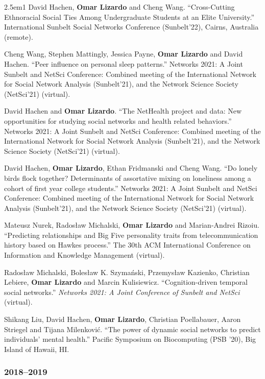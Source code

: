 \documentclass[
]{article}
\newenvironment{cventry}{\begin{hangparas}{2.5em}{1}}{\end{hangparas}}
\begin{document}
\begin{cventry}
David Hachen, \textbf{Omar Lizardo} and Cheng Wang. ``Cross-Cutting
Ethnoracial Social Ties Among Undergraduate Students at an Elite
University.'' International Sunbelt Social Networks Conference
(Sunbelt'22), Cairns, Australia (remote).

Cheng Wang, Stephen Mattingly, Jessica Payne, \textbf{Omar Lizardo} and
David Hachen. ``Peer influence on personal sleep patterns.'' Networks
2021: A Joint Sunbelt and NetSci Conference: Combined meeting of the
International Network for Social Network Analysis (Sunbelt'21), and the
Network Science Society (NetSci'21) (virtual).

David Hachen and \textbf{Omar Lizardo}. ``The NetHealth project and
data: New opportunities for studying social networks and health related
behaviors.'' Networks 2021: A Joint Sunbelt and NetSci Conference:
Combined meeting of the International Network for Social Network
Analysis (Sunbelt'21), and the Network Science Society (NetSci'21)
(virtual).

David Hachen, \textbf{Omar Lizardo}, Ethan Fridmanski and Cheng Wang.
``Do lonely birds flock together? Determinants of assortative mixing on
loneliness among a cohort of first year college students.'' Networks
2021: A Joint Sunbelt and NetSci Conference: Combined meeting of the
International Network for Social Network Analysis (Sunbelt'21), and the
Network Science Society (NetSci'21) (virtual).

Mateusz Nurek, Radosław Michalski, \textbf{Omar Lizardo} and
Marian-Andrei Rizoiu. ``Predicting relationships and Big Five
personality traits from telecommunication history based on Hawkes
process.'' The 30th ACM International Conference on Information and
Knowledge Management (virtual).

Radosław Michalski, Bolesław K. Szymański, Przemysław Kazienko,
Christian Lebiere, \textbf{Omar Lizardo} and Marcin Kulisiewicz.
``Cognition-driven temporal social networks.'' \emph{Networks 2021: A
Joint Conference of Sunbelt and NetSci} (virtual).

Shikang Liu, David Hachen, \textbf{Omar Lizardo}, Christian Poellabauer,
Aaron Striegel and Tijana Milenković. ``The power of dynamic social
networks to predict individuals' mental health.'' Pacific Symposium on
Biocomputing (PSB '20), Big Island of Hawaii, HI.

\end{cventry}

\subsubsection{2018--2019}\label{section-26}
\end{document}
